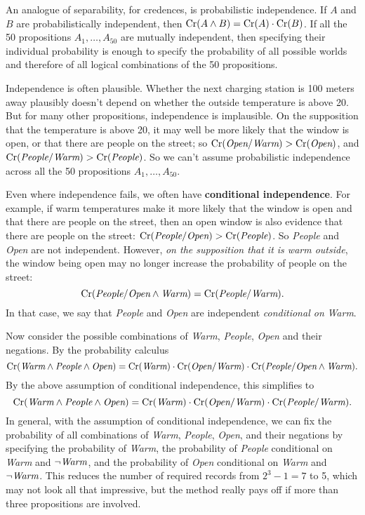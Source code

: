 An analogue of separability, for credences, is probabilistic
independence. If $A$ and $B$ are probabilistically independent, then
$\text{Cr}(A\land B) = \text{Cr}(A) \cdot \text{Cr}(B)$. If all the 50 propositions
$A_1,\ldots,A_{50}$ are mutually independent,
then specifying their individual probability is enough to specify the
probability of all possible worlds and therefore of all logical
combinations of the 50 propositions.

Independence is often plausible. Whether the next charging station is
100 meters away plausibly doesn't depend on whether the outside
temperature is above 20\celsius. But for many other propositions,
independence is implausible. On the supposition that the temperature
is above 20\celsius, it may well be more likely that the window is
open, or that there are people on the street; so
$\text{Cr}(\emph{Open}/\emph{Warm}) > \text{Cr}(\emph{Open})$, and
$\text{Cr}(\emph{People}/\emph{Warm}) > \text{Cr}(\emph{People})$. So we can't
assume probabilistic independence across all the 50 propositions $A_1,\ldots,A_{50}$.

Even where independence fails, we often have \textbf{conditional independence}. For example,
if warm temperatures make it more likely that the window is open and
that there are people on the street, then an open window is also evidence
that there are people on the street: $\text{Cr}(\emph{People}/\emph{Open}) >
\text{Cr}(\emph{People})$.  So \emph{People} and \emph{Open} are not
independent. However, \emph{on the supposition that it is warm
  outside}, the window being open may no longer increase the
probability of people on the street:
\[
\text{Cr}(\emph{People}/\emph{Open} \land \emph{Warm}) = \text{Cr}(\emph{People}/
\emph{Warm}).
\]
In that case, we say that \emph{People} and \emph{Open} are
independent \emph{conditional on} \emph{Warm}.

Now consider the possible combinations of \emph{Warm}, \emph{People},
\emph{Open} and their negations. By the probability calculus
\[
\text{Cr}(\emph{Warm} \land \emph{People} \land \emph{Open}) = 
\text{Cr}(\emph{Warm}) \cdot \text{Cr}(\emph{Open}/\emph{Warm}) \cdot \text{Cr}(\emph{People}/\emph{Open} \land \emph{Warm}).
\]
By the above assumption of conditional independence, this simplifies to
\[
\text{Cr}(\emph{Warm} \land \emph{People} \land \emph{Open}) = 
\text{Cr}(\emph{Warm}) \cdot \text{Cr}(\emph{Open}/\emph{Warm}) \cdot \text{Cr}(\emph{People}/\emph{Warm}).
\]
In general, with the assumption of conditional independence, we can
fix the probability of all combinations of \emph{Warm}, \emph{People},
\emph{Open}, and their negations by specifying the probability of
\emph{Warm}, the probability of \emph{People} conditional on
\emph{Warm} and $\neg\emph{Warm}$, and the probability of \emph{Open}
conditional on \emph{Warm} and $\neg\emph{Warm}$.  This reduces the
number of required records from $2^3-1 = 7$ to 5, which may not look
all that impressive, but the method really pays off if more than three
propositions are involved.

